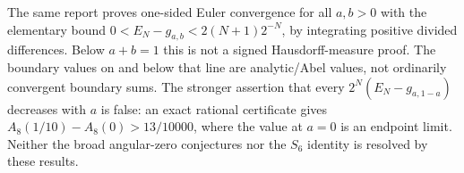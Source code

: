 The same report proves one-sided Euler convergence for all $a,b>0$
with the elementary bound $0<E_N-g_{a,b}<2(N+1)2^{-N}$, by integrating
positive divided differences. Below $a+b=1$ this is not a signed
Hausdorff-measure proof. The boundary values on and below that line
are analytic/Abel values, not ordinarily convergent boundary sums.
The stronger assertion that every $2^N(E_N-g_{a,1-a})$ decreases with
$a$ is false: an exact rational certificate gives
$A_8(1/10)-A_8(0)>13/10000$, where the value at $a=0$ is an endpoint
limit. Neither the broad angular-zero conjectures nor the $S_6$
identity is resolved by these results.
